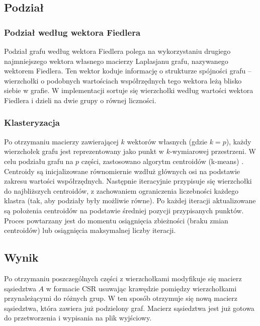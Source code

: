 \documentclass{article}
\begin{document}
    \subsection{Podział}

    \subsubsection{Podział według wektora Fiedlera}
    
    Podział grafu według wektora Fiedlera polega na wykorzystaniu drugiego najmniejszego wektora własnego macierzy Laplasjanu grafu, nazywanego wektorem Fiedlera. Ten wektor koduje informację o strukturze spójności grafu – wierzchołki o podobnych wartościach współrzędnych tego wektora leżą blisko siebie w grafie. W implementacji sortuje się wierzchołki według wartości wektora Fiedlera i dzieli na dwie grupy o równej liczności.
    
    \subsubsection{Klasteryzacja}
    Po otrzymaniu macierzy zawierającej \(k\) wektorów własnych (gdzie \(k = p\)), każdy wierzchołek grafu jest reprezentowany jako punkt w \(k\)-wymiarowej przestrzeni. W celu podziału grafu na \(p\) części, zastosowano algorytm centroidów (k-means) \cite{k-means}. Centroidy są inicjalizowane równomiernie wzdłuż głównych osi na podstawie zakresu wartości współrzędnych. Następnie iteracyjnie przypisuje się wierzchołki do najbliższych centroidów, z zachowaniem ograniczenia liczebności każdego klastra (tak, aby podziały były możliwie równe). Po każdej iteracji aktualizowane są położenia centroidów na podstawie średniej pozycji przypisanych punktów. Proces powtarzany jest do momentu osiągnięcia zbieżności (braku zmian centroidów) lub osiągnięcia maksymalnej liczby iteracji.



    \subsection{Wynik}

    Po otrzymaniu poszczególnych części z wierzchołkami modyfikuje się macierz sąsiedztwa \(A\) w formacie CSR usuwając krawędzie pomiędzy wierzchołkami przynależącymi do różnych grup. W ten sposób otrzymuje się nową macierz sąsiedztwa, która zawiera już podzielony graf. Macierz sąsiedztwa jest już gotowa do przetworzenia i wypisania na plik wyjściowy.
    
\end{document}
